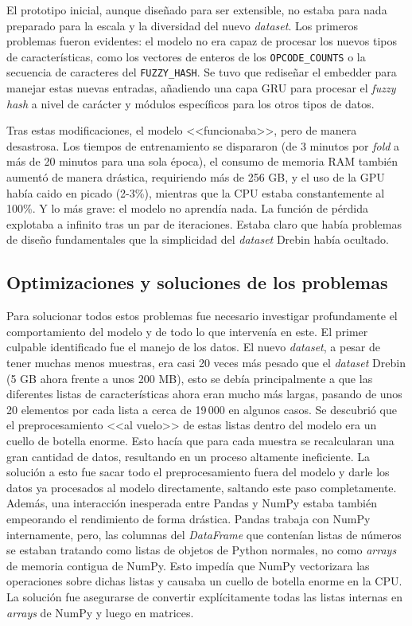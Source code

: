 El prototipo inicial, aunque diseñado para ser extensible, no estaba para nada preparado para la escala y la diversidad del nuevo \textit{dataset}. Los primeros problemas fueron evidentes: el modelo no era capaz de procesar los nuevos tipos de características, como los vectores de enteros de los \texttt{OPCODE\_COUNTS} o la secuencia de caracteres del \texttt{FUZZY\_HASH}. Se tuvo que rediseñar el embedder para manejar estas nuevas entradas, añadiendo una capa GRU para procesar el \textit{fuzzy hash} a nivel de carácter y módulos específicos para los otros tipos de datos.

Tras estas modificaciones, el modelo <<funcionaba>>, pero de manera desastrosa. Los tiempos de entrenamiento se dispararon (de 3 minutos por \textit{fold} a más de 20 minutos para una sola época), el consumo de memoria RAM también aumentó de manera drástica, requiriendo más de 256 GB, y el uso de la GPU había caido en picado (2-3\%), mientras que la CPU estaba constantemente al 100\%. Y lo más grave: el modelo no aprendía nada. La función de pérdida explotaba a infinito tras un par de iteraciones. Estaba claro que había problemas de diseño fundamentales que la simplicidad del \textit{dataset} Drebin había ocultado.

\subsection{Optimizaciones y soluciones de los problemas}

Para solucionar todos estos problemas fue necesario investigar profundamente el comportamiento del modelo y de todo lo que intervenía en este. El primer culpable identificado fue el manejo de los datos. El nuevo \textit{dataset}, a pesar de tener muchas menos muestras, era casi 20 veces más pesado que el \textit{dataset} Drebin (5 GB ahora frente a unos 200 MB), esto se debía principalmente a que las diferentes listas de características ahora eran mucho más largas, pasando de unos 20 elementos por cada lista a cerca de 19\,000 en algunos casos. Se descubrió que el preprocesamiento <<al vuelo>> de estas listas dentro del modelo era un cuello de botella enorme. Esto hacía que para cada muestra se recalcularan una gran cantidad de datos, resultando en un proceso altamente ineficiente. La solución a esto fue sacar todo el preprocesamiento fuera del modelo y darle los datos ya procesados al modelo directamente, saltando este paso completamente. Además, una interacción inesperada entre Pandas y NumPy estaba también empeorando el rendimiento de forma drástica. Pandas trabaja con NumPy internamente, pero, las columnas del \textit{DataFrame} que contenían listas de números se estaban tratando como listas de objetos de Python normales, no como \textit{arrays} de memoria contigua de NumPy. Esto impedía que NumPy vectorizara las operaciones sobre dichas listas y causaba un cuello de botella enorme en la CPU. La solución fue asegurarse de convertir explícitamente todas las listas internas en \textit{arrays} de NumPy y luego en matrices.

